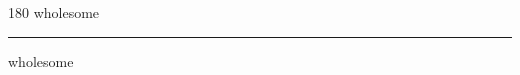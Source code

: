 
\begin{frame}
\begin{center}
\begin{turn}{180}
{\fontsize{2.5cm}{1em}\selectfont wholesome}
\end{turn}
\vspace{1em}\par  
\hrule
\vspace{1em}\par  
{\fontsize{2.5cm}{1em}\selectfont wholesome}
\end{center}
\end{frame}
